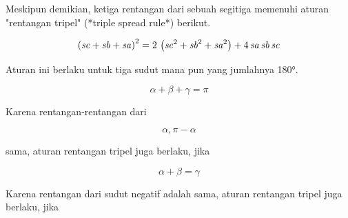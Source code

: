 \documentclass{article}
\newenvironment{eulernotebook}{\par}{\par}
\newenvironment{eulercomment}{\par\medskip}{\par\medskip}
\newenvironment{eulerformula}{}{}
\begin{document}
\begin{eulernotebook}
\begin{eulercomment}
\begin{eulercomment}
\begin{eulercomment}
Meskipun demikian, ketiga rentangan dari sebuah segitiga memenuhi
aturan "rentangan tripel" (*triple spread rule*) berikut.
\end{eulercomment}
\begin{eulerformula}
\[
\left({\it sc}+{\it sb}+{\it sa}\right)^2=2\,\left({\it sc}^2+  {\it sb}^2+{\it sa}^2\right)+4\,{\it sa}\,{\it sb}\,{\it sc}
\]
\end{eulerformula}
\begin{eulercomment}
Aturan ini berlaku untuk tiga sudut mana pun yang jumlahnya 180°.

\end{eulercomment}
\begin{eulerformula}
\[
\alpha+\beta+\gamma=\pi
\]
\end{eulerformula}
\begin{eulercomment}
Karena rentangan-rentangan dari

\end{eulercomment}
\begin{eulerformula}
\[
\alpha, \pi-\alpha
\]
\end{eulerformula}
\begin{eulercomment}
sama, aturan rentangan tripel juga berlaku, jika

\end{eulercomment}
\begin{eulerformula}
\[
\alpha+\beta=\gamma
\]
\end{eulerformula}
\begin{eulercomment}
Karena rentangan dari sudut negatif adalah sama, aturan rentangan
tripel juga berlaku, jika


\end{eulercomment}
\end{eulercomment}
\end{eulercomment}
\end{eulernotebook}
\end{document}
